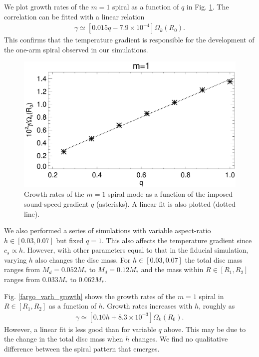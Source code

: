 We plot growth rates of the $m=1$ spiral as a function of $q$ in 
Fig. \ref{fargo_varq_growth}. The correlation can be fitted with a
linear relation
\begin{align*}
  \gamma \simeq \left[0.015 q - 7.9\times10^{-4}\right] \Omega_k(R_0). 
\end{align*}
This confirms that the temperature gradient is responsible for the
development of the one-arm spiral observed in our simulations. 
\begin{figure}
  \includegraphics[width=\linewidth]{figures/m1_analysis_plot_ratemax_fargo_varq.ps}    
  \caption{Growth rates of the $m=1$ spiral mode as a function of the
    imposed sound-speed gradient $q$ (asterisks). A linear fit is also
    plotted (dotted line). 
    \label{fargo_varq_growth}} 
\end{figure}

We also performed a series of simulations with variable aspect-ratio
$h\in[0.03,0.07]$ but fixed $q=1$. This also affects the temperature
gradient since $c_s \propto h$. However, with other parameters equal
to that in the fiducial simulation,  varying $h$ also changes the disc
mass. For $h\in[0.03,0.07]$ the total disc mass ranges from
$M_d=0.052M_*$ to $M_d=0.12M_*$ and the 
mass within $R\in[R_1,R_2]$  ranges from $0.033M_*$ to $0.062M_*$. 

Fig. \ref{fargo_varh_growth} shows the growth rates of the $m=1$
spiral in $R\in[R_1,R_2]$ as a function of $h$. Growth rates increases
with $h$, roughly as  
\begin{align}
  \gamma \simeq \left[0.10h + 8.3\times10^{-3}\right]\Omega_k(R_0).  
\end{align}
However, a linear fit is less good than for variable $q$ above. This
may be due to the change in the total disc mass when $h$ changes. We
find no qualitative difference between the spiral pattern that
emerges. 

